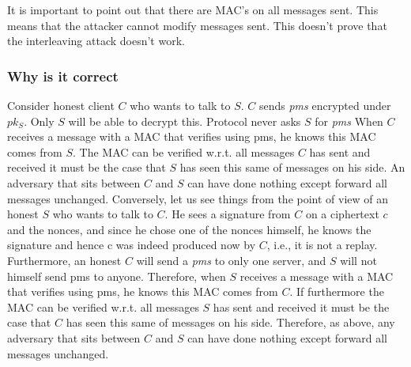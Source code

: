 \documentclass[14pt]{beamer}
\begin{document}
            \begin{frame}
                It is important to point out that there are MAC's on all messages sent. This means that the attacker cannot modify messages sent. This doesn't prove that the interleaving attack doesn't work. 
            \end{frame}

            \begin{frame}
                \frametitle{Why is it correct}
                    Consider honest client $C$ who wants to talk to $S$. $C$ sends \textit{pms} encrypted under $pk_S$.
                    Only $S$ will be able to decrypt this. 
                    Protocol never asks $S$ for \textit{pms} 
                    When $C$ receives a message with a MAC that verifies using pms, he knows this MAC comes from $S$. 
                    The MAC can be verified w.r.t. all messages $C$ has sent and received it must be the case that $S$ has seen this same of messages on his side. 
                    An adversary that sits between $C$ and $S$ can have done nothing except forward all messages unchanged. 
                    Conversely, let us see things from the point of view of an honest $S$ who wants to talk to $C$. He sees a signature from $C$ on a ciphertext $c$ and the nonces, and since he chose one of the nonces himself, he knows the signature and hence c was indeed produced now by $C$, i.e., it is not a replay. Furthermore, an honest $C$ will send a \textit{pms} to only one server, and $S$ will not himself send pms to anyone. Therefore, when $S$ receives a message with a MAC that verifies using pms, he knows this MAC comes from $C$. If furthermore the MAC can be verified w.r.t. all messages $S$ has sent and received it must be the case that $C$ has seen this same of messages on his side. Therefore, as above, any adversary that sits between $C$ and $S$ can have done nothing except forward all messages unchanged.
            \end{frame}
\end{document}
